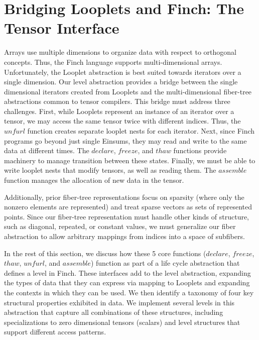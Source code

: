 \section{Bridging Looplets and Finch: The Tensor Interface}
%
%
%
%
Arrays use multiple dimensions to organize data with respect to orthogonal concepts.
%
Thus, the Finch language supports multi-dimensional arrays.
%
Unfortunately, the Looplet abstraction is best suited towards iterators over a single dimension.
%
Our level abstraction provides a bridge between the single dimensional iterators created from Looplets and the multi-dimensional fiber-tree abstractions common to tensor compilers.
% 
This bridge must address three challenges.
%
First, while Looplets represent an instance of an iterator over a tensor, we may access the same tensor twice with different indices.
%
Thus, the $unfurl$ function creates separate looplet nests for each iterator.
%
Next, since Finch programs go beyond just single Einsums, they may read and write to the same data at different times.
%
The $declare$, $freeze$, and $thaw$ functions provide machinery to manage transition between these states.
%
Finally, we must be able to write looplet nests that modify tensors, as well as reading them.
%
The $assemble$ function manages the allocation of new data in the tensor.

Additionally, prior fiber-tree representations focus on sparsity (where only the nonzero elements are represented) and treat sparse vectors as sets of represented points. Since our fiber-tree representation must handle other kinds of structure, such as diagonal, repeated, or constant values, we must generalize our fiber abstraction to allow arbitrary mappings from indices into a space of subfibers.

In the rest of this section, we discuss how these 5 core functions ($declare$, $freeze$, $thaw$, $unfurl$, and $assemble$) function as part of a life cycle abstraction that defines a level in Finch.
%
These interfaces add to the level abstraction, expanding the types of data that they can express via mapping to Looplets and expanding the contexts in which they can be used.
%
We then identify a taxonomy of four key structural properties exhibited in data.
%
We implement several levels in this abstraction that capture all combinations of these structures, 
including specializations to zero dimensional tensors (scalars) and level structures that support different access patterns.

